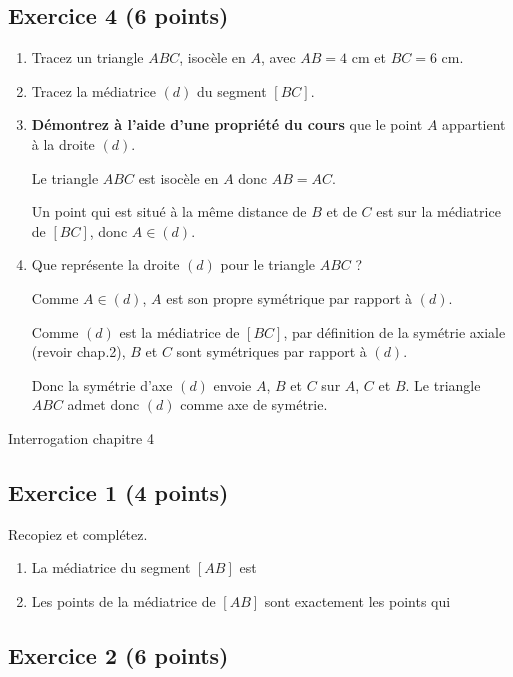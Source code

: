 \documentclass[14 pt]{extarticle}
\theoremstyle{plain}
\begin{document}
\subsection*{Exercice 4 (6 points)}
\begin{enumerate}
\item Tracez un triangle $ABC$, isocèle en $A$, avec $AB = 4$ cm et $BC = 6$ cm. 
\item Tracez la médiatrice $(d)$ du segment $[BC]$. 
\item \textbf{Démontrez à l'aide d'une propriété du cours} que le point $A$ appartient à la droite $(d)$. 

{\color{red} Le triangle $ABC$ est isocèle en $A$ donc $AB=AC$. 

Un point qui est situé à la même distance de $B$ et de $C$ est sur la médiatrice de $[BC]$, donc $A\in (d)$. }
\item Que représente la droite $(d)$ pour le triangle $ABC$ ?
{\color{red} Comme $A\in(d)$, $A$ est son propre symétrique par rapport à $(d)$. 

Comme $(d)$ est la médiatrice de $[BC]$, par définition de la symétrie axiale (revoir chap.2), $B$ et $C$ sont symétriques par rapport à $(d)$. 

Donc la symétrie d'axe $(d)$ envoie $A$, $B$ et $C$ sur $A$, $C$ et $B$. Le triangle $ABC$ admet donc $(d)$ comme axe de symétrie. }
\end{enumerate}

\newpage 


\begin{center}{\Large Interrogation chapitre 4}\\ 
 \end{center}
 
 \subsection*{Exercice 1 (4 points)}
 Recopiez et complétez. 
 \begin{enumerate}
 \item La médiatrice du segment $[AB]$ est {\color{red}{la droite qui coupe le segment en son milieu perpendiculairement.}}
 \item Les points de la médiatrice de $[AB]$ sont exactement les points qui {\color{red}{sont à la même distance de $A$ et de $B$.}}
 \end{enumerate}
 
 
 \subsection*{Exercice 2 (6 points)}
 
\end{document}

